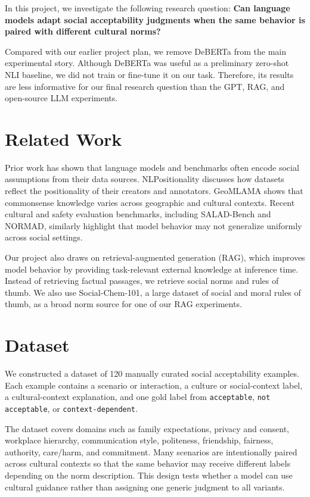 \documentclass[11pt]{article}
\begin{document}
In this project, we investigate the following research question: \textbf{Can language models adapt social acceptability judgments when the same behavior is paired with different cultural norms?}

Compared with our earlier project plan, we remove DeBERTa from the main experimental story. Although DeBERTa was useful as a preliminary zero-shot NLI baseline, we did not train or fine-tune it on our task. Therefore, its results are less informative for our final research question than the GPT, RAG, and open-source LLM experiments.

\section{Related Work}

Prior work has shown that language models and benchmarks often encode social assumptions from their data sources. NLPositionality discusses how datasets reflect the positionality of their creators and annotators. GeoMLAMA shows that commonsense knowledge varies across geographic and cultural contexts. Recent cultural and safety evaluation benchmarks, including SALAD-Bench and NORMAD, similarly highlight that model behavior may not generalize uniformly across social settings.

Our project also draws on retrieval-augmented generation (RAG), which improves model behavior by providing task-relevant external knowledge at inference time. Instead of retrieving factual passages, we retrieve social norms and rules of thumb. We also use Social-Chem-101, a large dataset of social and moral rules of thumb, as a broad norm source for one of our RAG experiments.

\section{Dataset}

We constructed a dataset of 120 manually curated social acceptability examples. Each example contains a scenario or interaction, a culture or social-context label, a cultural-context explanation, and one gold label from \texttt{acceptable}, \texttt{not acceptable}, or \texttt{context-dependent}.

The dataset covers domains such as family expectations, privacy and consent, workplace hierarchy, communication style, politeness, friendship, fairness, authority, care/harm, and commitment. Many scenarios are intentionally paired across cultural contexts so that the same behavior may receive different labels depending on the norm description. This design tests whether a model can use cultural guidance rather than assigning one generic judgment to all variants.
\end{document}
